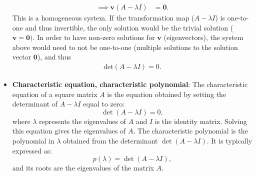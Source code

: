 \documentclass{report}
\begin{document}
\begin{itemize}
\begin{align*}
                \implies \mathbf{v}(A-\lambda I) &= \mathbf{0}
            .\end{align*}
            \bigbreak \noindent 
            This is a homogeneous system. If the transformation map ($A-\lambda I$) is one-to-one and thus invertible, the only solution would be the trivial solution ($\mathbf{v}  = \mathbf{0})$. In order to have non-zero solutions for $\mathbf{v}$ (eigenvectors), the system above would need to not be one-to-one (multiple solutions to the solution vector $\mathbf{0}$), and thus
            \begin{align*}
                \text{det}(A - \lambda I) = 0
            .\end{align*}
        \item \textbf{Characteristic equation, characteristic polynomial}:
        The characteristic equation of a square matrix \( A \) is the equation obtained by setting the determinant of \( A - \lambda I \) equal to zero:
            \[
                \det(A - \lambda I) = 0,
            \]
            where \( \lambda \) represents the eigenvalues of \( A \) and \( I \) is the identity matrix. Solving this equation gives the eigenvalues of \( A \).
             The characteristic polynomial is the polynomial in \( \lambda \) obtained from the determinant \( \det(A - \lambda I) \). It is typically expressed as:
            \[
                p(\lambda) = \det(A - \lambda I),
            \]
            and its roots are the eigenvalues of the matrix \( A \).


\end{itemize}
\end{document}
